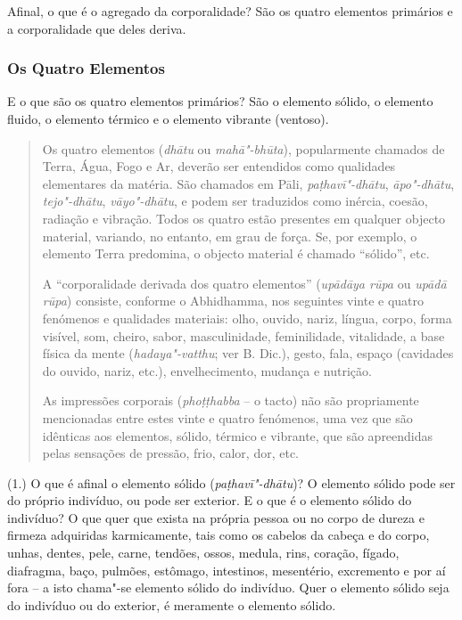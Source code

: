 
Afinal, o que é o agregado da corporalidade? São os quatro elementos primários e
a corporalidade que deles deriva.

\subsubsection{Os Quatro Elementos}

E o que são os quatro elementos primários? São o elemento sólido, o elemento
fluido, o elemento térmico e o elemento vibrante (ventoso).


\begin{quote}
  Os quatro elementos (\emph{dhātu} ou \emph{mahā"-bhūta}), popularmente chamados
  de Terra, Água, Fogo e Ar, deverão ser entendidos como qualidades elementares
  da matéria. São chamados em Pāli, \emph{pa\d{t}havī"-dhātu}, \emph{āpo"-dhātu},
  \emph{tejo"-dhātu}, \emph{vāyo"-dhātu}, e podem ser traduzidos como inércia,
  coesão, radiação e vibração. Todos os quatro estão presentes em qualquer
  objecto material, variando, no entanto, em grau de força. Se, por exemplo, o
  elemento Terra predomina, o objecto material é chamado ``sólido'', etc.

  A ``corporalidade derivada dos quatro elementos'' (\emph{upādāya rūpa} ou
  \emph{upādā rūpa}) consiste, conforme o Abhidhamma, nos seguintes vinte e
  quatro fenómenos e qualidades materiais: olho, ouvido, nariz, língua, corpo,
  forma visível, som, cheiro, sabor, masculinidade, feminilidade, vitalidade, a
  base física da mente (\emph{hadaya"-vatthu}; ver B. Dic.), gesto, fala, espaço
  (cavidades do ouvido, nariz, etc.), envelhecimento, mudança e nutrição.

  As impressões corporais (\emph{pho\d{t}\d{t}habba} -- o tacto) não são propriamente
  mencionadas entre estes vinte e quatro fenómenos, uma vez que são idênticas
  aos elementos, sólido, térmico e vibrante, que são apreendidas pelas sensações
  de pressão, frio, calor, dor, etc.
\end{quote}

(1.) O que é afinal o elemento sólido (\emph{paṭhavī"-dhātu})? O elemento sólido
pode ser do próprio indivíduo, ou pode ser exterior. E o que é o elemento sólido
do indivíduo? O que quer que exista na própria pessoa ou no corpo de dureza e
firmeza adquiridas karmicamente, tais como os cabelos da cabeça e do corpo,
unhas, dentes, pele, carne, tendões, ossos, medula, rins, coração, fígado,
diafragma, baço, pulmões, estômago, intestinos, mesentério, excremento e por aí
fora -- a isto chama"-se elemento sólido do indivíduo. Quer o elemento sólido
seja do indivíduo ou do exterior, é meramente o elemento sólido.

